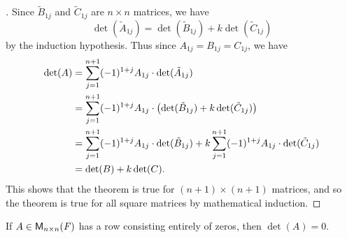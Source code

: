 \begin{proof}[]
  Since \(\tilde{B}_{1 j}\) and \(\tilde{C}_{1 j}\) are \(n \times n\) matrices, we have
  \[
    \det(\tilde{A}_{1 j}) = \det(\tilde{B}_{1 j}) + k \det(\tilde{C}_{1 j})
  \]
  by the induction hypothesis.
  Thus since \(A_{1 j} = B_{1 j} = C_{1 j}\), we have
  \begin{align*}
    \det(A) & = \sum_{j = 1}^{n + 1} (-1)^{1 + j} A_{1 j} \cdot \det(\tilde{A}_{1 j})                                                                           \\
            & = \sum_{j = 1}^{n + 1} (-1)^{1 + j} A_{1 j} \cdot \left\lparen\det(\tilde{B}_{1 j}) + k \det(\tilde{C}_{1 j})\right\rparen                                            \\
            & = \sum_{j = 1}^{n + 1} (-1)^{1 + j} A_{1 j} \cdot \det(\tilde{B}_{1 j}) + k \sum_{j = 1}^{n + 1} (-1)^{1 + j} A_{1 j} \cdot \det(\tilde{C}_{1 j}) \\
            & = \det(B) + k \det(C).
  \end{align*}
  This shows that the theorem is true for \((n + 1) \times (n + 1)\) matrices, and so the theorem is true for all square matrices by mathematical induction.
\end{proof}

\begin{cor}\label{4.2.4}
  If \(A \in \mathsf{M}_{{n} \times n}({\mathit{F}})\) has a row consisting entirely of zeros, then \(\det(A) = 0\).
\end{cor}

